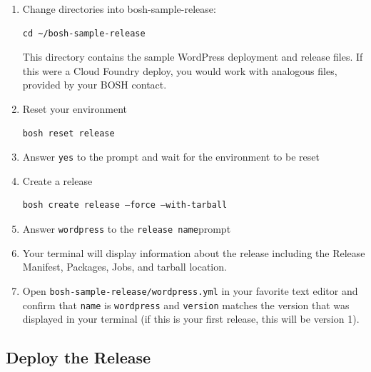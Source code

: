 \begin{enumerate}
\item Change directories into bosh-sample-release:

\begin{verbatim}
cd ~/bosh-sample-release
\end{verbatim}


This directory contains the sample WordPress deployment and release files. If this were a Cloud Foundry deploy, you would work with analogous files, provided by your BOSH contact.

\item Reset your environment

\begin{verbatim}
bosh reset release
\end{verbatim}


\item Answer \texttt{yes} to the prompt and wait for the environment to be reset

\item Create a release

\begin{verbatim}
bosh create release –force –with-tarball
\end{verbatim}


\item Answer \texttt{wordpress} to the \texttt{release name}prompt

\item Your terminal will display information about the release including the Release Manifest, Packages, Jobs, and tarball location.

\item Open \texttt{bosh-sample-release\slash wordpress.yml} in your favorite text editor and confirm that \texttt{name} is \texttt{wordpress} and \texttt{version} matches the version that was displayed in your terminal (if this is your first release, this will be version 1).

\end{enumerate}

\subsection{Deploy the Release}
\label{deploytherelease}

